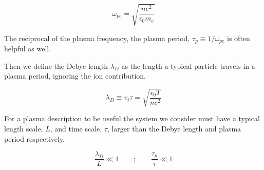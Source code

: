         \[ \omega_{pe} = \sqrt{\frac{ne^2}{\epsilon_0 m_e}} \]

        The reciprocal of the plasma frequency, the plasma period, \(\tau_p \equiv 1/\omega_{pe}\) is often
        helpful as well.

        Then we define the Debye length \(\lambda_D\) as the length a typical particle
        travels in a plasma period, ignoring the ion contribution.

        \[\lambda_D \equiv v_t \tau = \sqrt{\frac{\epsilon_0 T}{n e^2}}\]

        For a plasma description to be useful the system we consider must have
        a typical length scale, \(L\), and time scale, \(\tau\), larger than the Debye length and plasma
        period respectively.

        \[\frac{\lambda_D}{L} \ll 1  \qquad{;} \qquad \frac{\tau_p}{\tau} \ll 1 \]


















